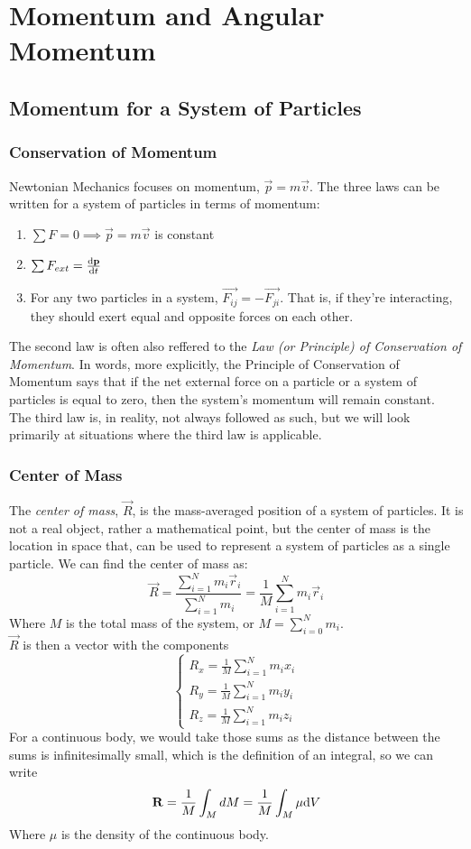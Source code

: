\documentclass[a4paper]{article}
\begin{document}
\section{Momentum and Angular Momentum}
\subsection{Momentum for a System of Particles}
\subsubsection{Conservation of Momentum}
Newtonian Mechanics focuses on momentum, $\vec{p}=m\vec{v}$. The three laws
can be written for a system of particles in terms of momentum:
\begin{enumerate}
    \item $\sum F = 0 \implies \vec{p}=m\vec{v}$ is constant
    \item $\sum F_{ext} = \frac{\mathrm{d}\boldsymbol{\mathbf{p}}}{\mathrm{d} t}$
    \item For any two particles in a system, $\vec{F_{ij}} = -\vec{F_{ji}}$.
    That is, if they're interacting, they should exert equal and opposite
    forces on each other.
\end{enumerate}
The second law is often also reffered to the \emph{Law (or Principle) of
Conservation of Momentum}. In words, more explicitly, the Principle of
Conservation of Momentum says that if the net external force on a particle
or a system of particles is equal to zero, then the system's momentum will
remain constant.\\
The third law is, in reality, not always followed as such, but we will look 
primarily at situations where the third law is applicable.

\subsubsection{Center of Mass}
The \emph{center of mass}, $\vec{R}$, is the mass-averaged position of a system
of particles. It is not a real object, rather a mathematical point, but the
center of mass is the location in space that, can be used to represent a system
of particles as a single particle. We can find the center of mass as:
\[
    \vec{R} = \frac{\sum^N_{i=1} m_i\vec{r}_i}{\sum^N_{i=1} m_i}
    = \frac{1}{M}\sum^N_{i=1} m_i\vec{r}_i
\]
Where $M$ is the total mass of the system, or $M=\sum_{i=0}^N m_i$.\\
$\vec{R}$ is then a vector with the components
\[
    \begin{cases}
        R_x = \frac{1}{M}\sum^N_{i=1}m_ix_i\\
        R_y = \frac{1}{M}\sum^N_{i=1}m_iy_i\\
        R_z = \frac{1}{M}\sum^N_{i=1}m_iz_i
    \end{cases}    
\]
For a continuous body, we would take those sums as the distance between the sums
is infinitesimally small, which is the definition of an integral, so we can
write
\[
    \boldsymbol{\mathbf{R}} = \frac{1}{M}\int_M dM = \frac{1}{M}\int_M\mu\mathrm{d} V
\]
Where $\mu$ is the density of the continuous body.
\end{document}
